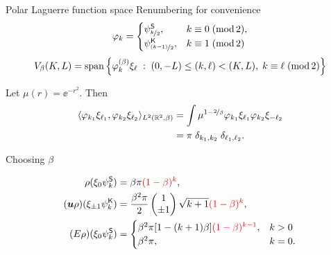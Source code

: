 \documentclass[hyperref={bookmarksopen, colorlinks, linkcolor=blue, urlcolor=green, citecolor=red}, color={usenames,dvipsnames}]{beamer}
\begin{document}
\begin{frame}{Polar Laguerre function space}
Renumbering for convenience
\begin{gather*}
    \varphi_k = \begin{cases} \psi^{\mathsf{S}}_{\nicefrac{k}{2}}, & k \equiv 0 \;(\operatorname{mod} 2), \\
                              \psi^{\mathsf{K}}_{\nicefrac{(k-1)}{2}}, & k \equiv 1 \;(\operatorname{mod} 2)
                \end{cases}
\end{gather*}
\[
    V_\beta(K,L) = \operatorname{span} \left\{ \varphi_k^{(\beta)} \xi_\ell \;:\; 
    (0,-L) \leq (k,\ell) < (K,L),\; k\equiv\ell \;(\operatorname{mod} 2) \right\}
\]
\begin{theorem}
    Let $\mu(r) = \ee^{-r^2}$. Then
    \begin{align*}
        \langle \varphi_{k_1} \xi_{\ell_1}, \varphi_{k_2} \xi_{\ell_2} \rangle_{L^2(\mathbb{R}^2,\beta)}
        &= \int \mu^{1-\nicefrac{2}{\beta}} \varphi_{k_1} \xi_{\ell_1} \varphi_{k_2} \xi_{-\ell_2} \\
        &= \pi \; \delta_{k_1,k_2} \; \delta_{\ell_1,\ell_2}.
    \end{align*}
\end{theorem}
\end{frame}

\begin{frame}{Choosing $\beta$}
\begin{theorem}
    \begin{align*}
        \rho(\xi_0\psi^{\mathsf{S}}_k) &= \beta\pi{\color{red}(1-\beta)^k}, \\
        ({\bm u}\rho)(\xi_{\pm1}\psi^{\mathsf{K}}_k) &= \frac{\beta^2\pi}{2}\begin{pmatrix}1\\\pm1\end{pmatrix}
        \sqrt{k+1} {\color{red}(1-\beta)^k}, \\
        (E\rho)(\xi_0\psi^{\mathsf{S}}_k) &= \begin{cases} \beta^2\pi[1-(k+1)\beta]
                                                    {\color{red}(1-\beta)^{k-1}}, & k>0 \\
                                                    \beta^2\pi, & k=0. \end{cases}
    \end{align*}
\end{theorem}
\end{frame}
\end{document}
